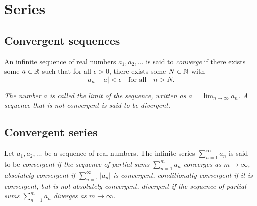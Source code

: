 \section{Series}

\subsection{Convergent sequences}
\begin{definition}
An infinite sequence of real numbers $a_1,a_2,\ldots$ is said to \emph{converge} if there exists some $a\in\mathbb{R}$ such that for all $\epsilon>0$, there exists some $N\in\mathbb{N}$ with
\[
|a_n - a| < \epsilon \quad\text{for all}\quad n > N.
\]
\end{definition}

\begin{remark}
\ben
\it The number $a$ is called the \emph{limit} of the sequence, written as $a = \lim_{n\to\infty}a_n $. 
\it A sequence that is not convergent is said to be \emph{divergent}.
\een
\end{remark}

\subsection{Convergent series}

\begin{definition}
Let $a_1,a_2,\ldots$ be a sequence of real numbers. The infinite series $\sum_{n=1}^{\infty} a_n$ is said to be
\ben
\it
\emph{convergent} if the sequence of partial sums $\sum_{n=1}^m a_n$ converges as $m\to\infty$,
\it
\emph{absolutely convergent} if $\sum_{n=1}^{\infty} |a_n|$ is convergent, 
\it
\emph{conditionally convergent} if it is convergent, but is not absolutely convergent,
\it
\emph{divergent} if the sequence of partial sums $\sum_{n=1}^m a_n$ diverges as $m\to\infty$.
\een
\end{definition}

